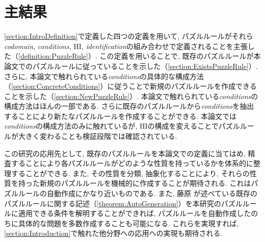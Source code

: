 \section{主結果}
\cref{section:IntroDefinition}で定義した四つの定義を用いて, パズルルールがそれら\textit{codomain}, \textit{conditions}, HI, \textit{identification}の組み合わせで定義されることを主張した（\cref{definition:PuzzleRule}）. この定義を用いることで, 既存のパズルルールが本論文でのパズルルールに従っていることを示した（\cref{section:ExistsPuzzleRule}）. さらに, 本論文で触れられている\textit{conditions}の具体的な構成方法（\cref{section:ConcreteConditions}）に従うことで新規のパズルルールを作成できることを示した（\cref{section:NewPuzzleRule}）. 本論文で触れられている\textit{conditions}の構成方法はほんの一部である. さらに既存のパズルルールから\textit{conditions}を抽出することにより新たなパズルルールを作成することができる. 本論文では\textit{conditions}の構成方法のみに触れているが, HIの構成を変えることでパズルルールが大きく変わることも検証段階では確認されている.

この研究の応用先として, 既存のパズルルールを本論文での定義に当てはめ, 精査することにより各パズルルールがどのような性質を持っているかを体系的に整理することができる. また, その性質を分類, 抽象化することにより, それらの性質を持った新規のパズルルールを機械的に作成することが期待される. これはパズルルールの自動作成にかなり近いものである. また, 藤原 \cite{Fujiwara2022}が述べている既存のパズルルールに関する記述（\cref{theorem:AutoGeneration}）を本研究のパズルルールに適用できる条件を解明することができれば, パズルルールを自動作成したのちに具体的な問題を多数作成することも可能になる. これらを実現すれば, \cref{section:Introduction}で触れた他分野への応用への実現も期待される.